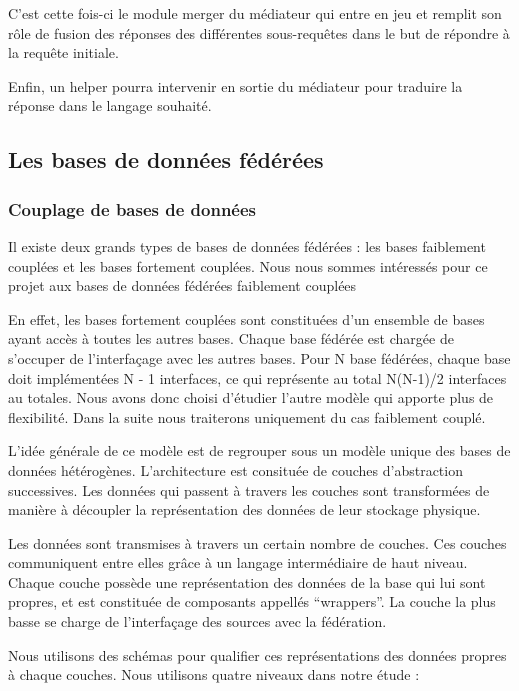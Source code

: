 C’est cette fois-ci le module merger du médiateur qui entre en jeu et remplit son rôle de fusion des réponses des différentes sous-requêtes dans le but de répondre à la requête initiale.

Enfin, un helper pourra intervenir en sortie du médiateur pour traduire la réponse dans le langage souhaité.

\subsection{Les bases de données fédérées}

\subsubsection{Couplage de bases de données}

Il existe deux grands types de bases de données fédérées : les bases faiblement couplées et les bases fortement couplées. Nous nous sommes intéressés pour ce projet aux bases de données fédérées faiblement couplées

En effet, les bases fortement couplées sont constituées d’un ensemble de bases ayant accès à toutes les autres bases. Chaque base fédérée est chargée de s’occuper de l’interfaçage avec les autres bases. Pour N base fédérées, chaque base doit implémentées N - 1 interfaces, ce qui représente au total N(N-1)/2 interfaces au totales. Nous avons donc choisi d’étudier l’autre modèle qui apporte plus de flexibilité. Dans la suite nous traiterons uniquement du cas faiblement couplé.

L’idée générale de ce modèle est de regrouper sous un modèle unique des bases de données hétérogènes. L’architecture est consituée de couches d’abstraction successives. Les données qui passent à travers les couches sont transformées de manière à découpler la représentation des données de leur stockage physique.

Les données sont transmises à travers un certain nombre de couches. Ces couches communiquent entre elles grâce à un langage intermédiaire de haut niveau. Chaque couche possède une représentation des données de la base qui lui sont propres, et est constituée de composants appellés “wrappers”. La couche la plus basse se charge de l’interfaçage des sources avec la fédération.

Nous utilisons des schémas pour qualifier ces représentations des données propres à chaque couches. Nous utilisons quatre niveaux dans notre étude :

